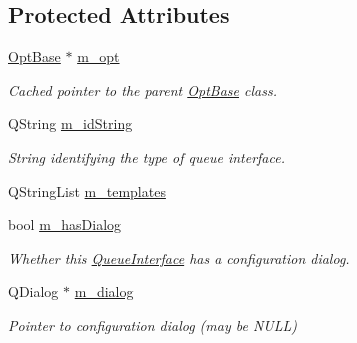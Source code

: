\subsection*{Protected Attributes}
\begin{DoxyCompactItemize}
\item 
\hypertarget{classGlobalSearch_1_1QueueInterface_aadfac830d9d1551ceb3d4c80937c9b9e}{}\hyperlink{classGlobalSearch_1_1OptBase}{Opt\+Base} $\ast$ \hyperlink{classGlobalSearch_1_1QueueInterface_aadfac830d9d1551ceb3d4c80937c9b9e}{m\+\_\+opt}\label{classGlobalSearch_1_1QueueInterface_aadfac830d9d1551ceb3d4c80937c9b9e}

\begin{DoxyCompactList}\small\item\em Cached pointer to the parent \hyperlink{classGlobalSearch_1_1OptBase}{Opt\+Base} class. \end{DoxyCompactList}\item 
\hypertarget{classGlobalSearch_1_1QueueInterface_a695d33f6164f7d83cbe6e0b6d3c5b730}{}Q\+String \hyperlink{classGlobalSearch_1_1QueueInterface_a695d33f6164f7d83cbe6e0b6d3c5b730}{m\+\_\+id\+String}\label{classGlobalSearch_1_1QueueInterface_a695d33f6164f7d83cbe6e0b6d3c5b730}

\begin{DoxyCompactList}\small\item\em String identifying the type of queue interface. \end{DoxyCompactList}\item 
Q\+String\+List \hyperlink{classGlobalSearch_1_1QueueInterface_afbece4079dfba7a2cf11c32153c777a7}{m\+\_\+templates}
\item 
\hypertarget{classGlobalSearch_1_1QueueInterface_a81933da94485f46aec4263172eaf604f}{}bool \hyperlink{classGlobalSearch_1_1QueueInterface_a81933da94485f46aec4263172eaf604f}{m\+\_\+has\+Dialog}\label{classGlobalSearch_1_1QueueInterface_a81933da94485f46aec4263172eaf604f}

\begin{DoxyCompactList}\small\item\em Whether this \hyperlink{classGlobalSearch_1_1QueueInterface}{Queue\+Interface} has a configuration dialog. \end{DoxyCompactList}\item 
\hypertarget{classGlobalSearch_1_1QueueInterface_ae7485212b5aa09c35ec6b1fbfadfeb5d}{}Q\+Dialog $\ast$ \hyperlink{classGlobalSearch_1_1QueueInterface_ae7485212b5aa09c35ec6b1fbfadfeb5d}{m\+\_\+dialog}\label{classGlobalSearch_1_1QueueInterface_ae7485212b5aa09c35ec6b1fbfadfeb5d}

\begin{DoxyCompactList}\small\item\em Pointer to configuration dialog (may be N\+U\+L\+L) \end{DoxyCompactList}\end{DoxyCompactItemize}


